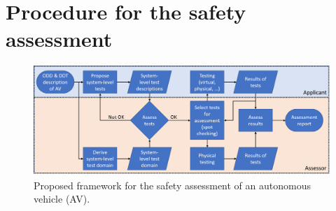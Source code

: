 \section{Procedure for the safety assessment}
\label{sec:procedure}

\begin{figure}
	\centering
	\includegraphics[width=\linewidth]{figures/procedure}
	\caption{Proposed framework for the safety assessment of an autonomous vehicle (AV).}
	\label{fig:procedure}
\end{figure}

